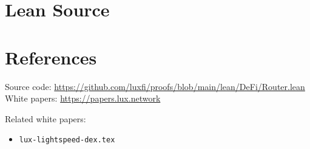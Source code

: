 \documentclass[11pt]{article}
\begin{document}
\section{Lean Source}


\section{References}
\noindent Source code: \url{https://github.com/luxfi/proofs/blob/main/lean/DeFi/Router.lean}\\
\noindent White papers: \url{https://papers.lux.network}

\noindent Related white papers:
\begin{itemize}
  \item \texttt{lux-lightspeed-dex.tex}
\end{itemize}
\end{document}
